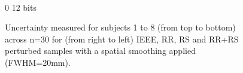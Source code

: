 \documentclass{article}
\begin{document}
\begin{appendices}
\begin{landscape}
\begin{figure}
\begin{subfigure}[t]{0.2\paperheight}
            \end{subfigure} \\
            \hspace*{6cm} 0  12 bits
            \caption{Uncertainty measured for subjects 1 to 8 (from top to bottom) across n=30 for
                (from right to left) IEEE, RR, RS and RR+RS perturbed samples with a spatial smoothing applied (FWHM=20mm). }
            \label{fig:uncertainty_20mm}

        \end{figure}
    \end{landscape}


\end{appendices}




\end{document}
